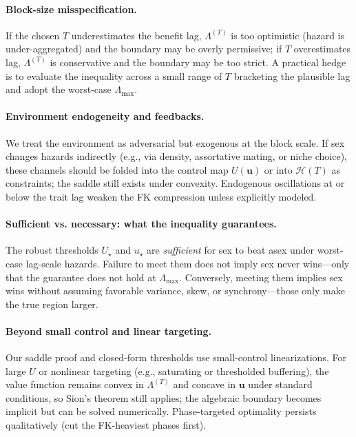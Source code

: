 \documentclass[11pt]{article}
\theoremstyle{upright}
\newcommand{\horizon}{\Lambda}
\newcommand{\Lmax}{\horizon^{(T)}_{\max}}
\newcommand{\hazT}[1]{\Lambda^{(#1)}}          %
\renewcommand{\Lmax}{\Lambda_{\max}}
\begin{document}
\paragraph{Block-size misspecification.}
If the chosen $T$ underestimates the benefit lag, $\hazT{T}$ is too optimistic (hazard is under-aggregated) and the boundary may be overly permissive; if $T$ overestimates lag, $\hazT{T}$ is conservative and the boundary may be too strict. A practical hedge is to evaluate the inequality across a small range of $T$ bracketing the plausible lag and adopt the worst-case $\Lmax$.

\paragraph{Environment endogeneity and feedbacks.}
We treat the environment as adversarial but exogenous at the block scale. If sex changes hazards indirectly (e.g., via density, assortative mating, or niche choice), these channels should be folded into the control map $U(\mathbf u)$ or into $\mathcal H(T)$ as constraints; the saddle still exists under convexity. Endogenous oscillations at or below the trait lag weaken the FK compression unless explicitly modeled.

\paragraph{Sufficient vs. necessary: what the inequality guarantees.}
The robust thresholds $U_\star$ and $u_\star$ are \emph{sufficient} for sex to beat asex under worst-case lag-scale hazards. Failure to meet them does not imply sex never wins—only that the guarantee does not hold at $\Lmax$. Conversely, meeting them implies sex wins without assuming favorable variance, skew, or synchrony—those only make the true region larger.

\paragraph{Beyond small control and linear targeting.}
Our saddle proof and closed-form thresholds use small-control linearizations. For large $U$ or nonlinear targeting (e.g., saturating or thresholded buffering), the value function remains convex in $\hazT{T}$ and concave in $\mathbf u$ under standard conditions, so Sion’s theorem still applies; the algebraic boundary becomes implicit but can be solved numerically. Phase-targeted optimality persists qualitatively (cut the FK-heaviest phases first).
\end{document}
